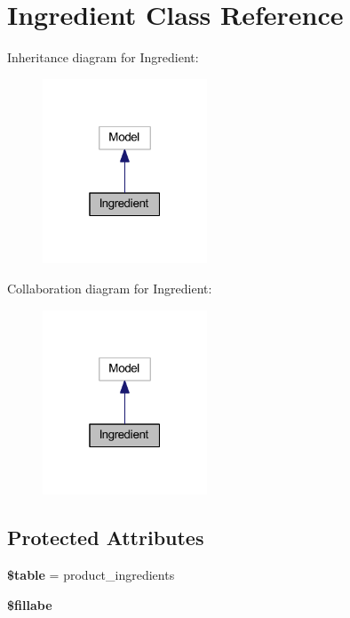 \hypertarget{class_app_1_1_models_1_1_product_1_1_ingredient}{}\section{Ingredient Class Reference}
\label{class_app_1_1_models_1_1_product_1_1_ingredient}


Inheritance diagram for Ingredient\+:
\nopagebreak
\begin{figure}[H]
\begin{center}
\leavevmode
\includegraphics[width=139pt]{class_app_1_1_models_1_1_product_1_1_ingredient__inherit__graph}
\end{center}
\end{figure}


Collaboration diagram for Ingredient\+:
\nopagebreak
\begin{figure}[H]
\begin{center}
\leavevmode
\includegraphics[width=139pt]{class_app_1_1_models_1_1_product_1_1_ingredient__coll__graph}
\end{center}
\end{figure}
\subsection*{Protected Attributes}
\begin{DoxyCompactItemize}
\item 
\mbox{\label{class_app_1_1_models_1_1_product_1_1_ingredient_ae8876a14058f368335baccf35af4a22b}} 
{\bfseries \$table} = \textquotesingle{}product\+\_\+ingredients\textquotesingle{}
\item 
{\bfseries \$fillabe}
\end{DoxyCompactItemize}


